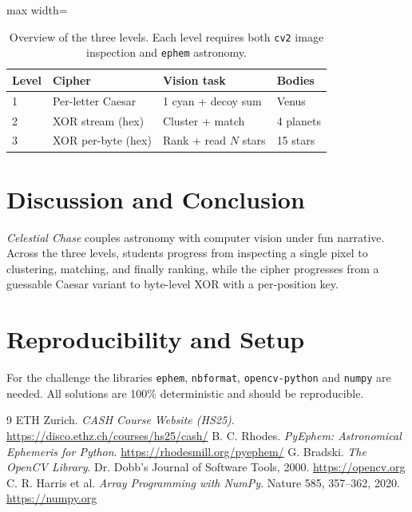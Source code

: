 \documentclass[10pt,twocolumn]{article}
\begin{document}
\begin{table}[t]
    \centering
    \caption{Overview of the three levels. Each level requires both \texttt{cv2} image inspection and \texttt{ephem} astronomy.}
    \label{tab:levels}
    \begin{adjustbox}{max width=\linewidth}
    \begin{tabular}{@{}llll@{}}
        \toprule
        \textbf{Level} & \textbf{Cipher} & \textbf{Vision task} & \textbf{Bodies} \\
        \midrule
        1 & Per-letter Caesar      & 1 cyan + decoy sum    & Venus \\
        2 & XOR stream (hex)       & Cluster + match       & 4 planets \\
        3 & XOR per-byte (hex)     & Rank + read $N$ stars & 15 stars \\
        \bottomrule
    \end{tabular}
    \end{adjustbox}
\end{table}


\section{Discussion and Conclusion}

\textit{Celestial Chase} couples astronomy with computer vision under fun narrative. Across the three levels, students progress from inspecting a single pixel to clustering, matching, and finally ranking, while the cipher progresses from a guessable Caesar variant to byte-level XOR with a per-position key. 

\appendix
\section{Reproducibility and Setup}

For the challenge the libraries \texttt{ephem}, \texttt{nbformat}, \texttt{opencv-python} and \texttt{numpy} are needed. All solutions are 100\% deterministic and should be reproducible.

\begin{thebibliography}{9}
 ETH Zurich. \textit{CASH Course Website (HS25)}. \url{https://disco.ethz.ch/courses/hs25/cash/}
 B. C. Rhodes. \textit{PyEphem: Astronomical Ephemeris for Python}. \url{https://rhodesmill.org/pyephem/}
 G. Bradski. \textit{The OpenCV Library}. Dr. Dobb's Journal of Software Tools, 2000. \url{https://opencv.org}
 C. R. Harris et al. \textit{Array Programming with NumPy}. Nature 585, 357--362, 2020. \url{https://numpy.org}
\end{thebibliography}
\end{document}
